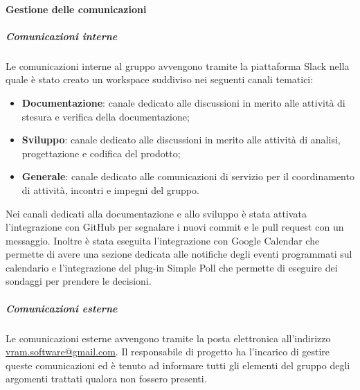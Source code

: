 			\paragraph{Gestione delle comunicazioni}
				\subparagraph*{Comunicazioni interne}
					Le comunicazioni interne al gruppo avvengono tramite la piattaforma Slack nella quale è stato creato un workspace suddiviso nei seguenti canali tematici:
					\begin{itemize}
						\item \textbf{Documentazione}: canale dedicato alle discussioni in merito alle attività di stesura e verifica della documentazione;
						\item \textbf{Sviluppo}: canale dedicato alle discussioni in merito alle attività di analisi, progettazione e codifica del prodotto;
						\item \textbf{Generale}: canale dedicato alle comunicazioni di servizio per il coordinamento di attività, incontri e impegni del gruppo.
					\end{itemize}
					Nei canali dedicati alla documentazione e allo sviluppo è stata attivata l'integrazione con GitHub per segnalare i nuovi commit e le pull request con un messaggio.
					Inoltre è stata eseguita l'integrazione con Google Calendar che permette di avere una sezione dedicata alle notifiche degli eventi programmati sul calendario e l'integrazione del plug-in Simple Poll che permette di eseguire dei sondaggi per prendere le decisioni.
				\subparagraph*{Comunicazioni esterne}
					Le comunicazioni esterne avvengono tramite la posta elettronica all'indirizzo \url{vram.software@gmail.com}.
					Il responsabile di progetto ha l'incarico di gestire queste comunicazioni ed è tenuto ad informare tutti gli elementi del gruppo degli argomenti trattati qualora non fossero presenti.
